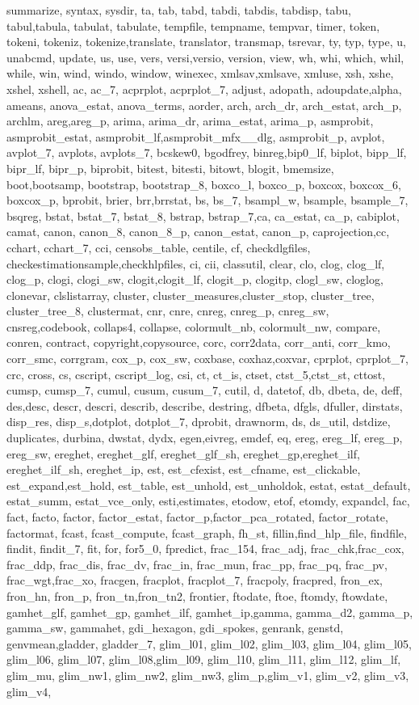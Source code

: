 {{summarize, syntax, sysdir, ta, tab, tabd, tabdi, tabdis, tabdisp, tabu, tabul,tabula, tabulat, tabulate, tempfile, tempname, tempvar, timer, token, tokeni, tokeniz, tokenize,translate, translator, transmap, tsrevar, ty, typ, type, u, unabcmd, update, us, use, vers, versi,versio, version, view, wh, whi, which, whil, while, win, wind, windo, window, winexec, xmlsav,xmlsave, xmluse, xsh, xshe, xshel, xshell, ac, ac_7, acprplot, acprplot_7, adjust, adopath, adoupdate,alpha, ameans, anova_estat, anova_terms, aorder, arch, arch_dr, arch_estat, arch_p, archlm, areg,areg_p, arima, arima_dr, arima_estat, arima_p, asmprobit, asmprobit_estat, asmprobit_lf,asmprobit_mfx__dlg, asmprobit_p, avplot, avplot_7, avplots, avplots_7, bcskew0, bgodfrey, binreg,bip0_lf, biplot, bipp_lf, bipr_lf, bipr_p, biprobit, bitest, bitesti, bitowt, blogit, bmemsize, boot,bootsamp, bootstrap, bootstrap_8, boxco_l, boxco_p, boxcox, boxcox_6, boxcox_p, bprobit, brier, brr,brrstat, bs, bs_7, bsampl_w, bsample, bsample_7, bsqreg, bstat, bstat_7, bstat_8, bstrap, bstrap_7,ca, ca_estat, ca_p, cabiplot, camat, canon, canon_8, canon_8_p, canon_estat, canon_p, caprojection,cc, cchart, cchart_7, cci, censobs_table, centile, cf, checkdlgfiles, checkestimationsample,checkhlpfiles, ci, cii, classutil, clear, clo, clog, clog_lf, clog_p, clogi, clogi_sw, clogit,clogit_lf, clogit_p, clogitp, clogl_sw, cloglog, clonevar, clslistarray, cluster, cluster_measures,cluster_stop, cluster_tree, cluster_tree_8, clustermat, cnr, cnre, cnreg, cnreg_p, cnreg_sw, cnsreg,codebook, collaps4, collapse, colormult_nb, colormult_nw, compare, conren, contract, copyright,copysource, corc, corr2data, corr_anti, corr_kmo, corr_smc, corrgram, cox_p, cox_sw, coxbase, coxhaz,coxvar, cprplot, cprplot_7, crc, cross, cs, cscript, cscript_log, csi, ct, ct_is, ctset, ctst_5,ctst_st, cttost, cumsp, cumsp_7, cumul, cusum, cusum_7, cutil, d, datetof, db, dbeta, de, deff, des,desc, descr, descri, describ, describe, destring, dfbeta, dfgls, dfuller, dirstats, disp_res, disp_s,dotplot, dotplot_7, dprobit, drawnorm, ds, ds_util, dstdize, duplicates, durbina, dwstat, dydx, egen,eivreg, emdef, eq, ereg, ereg_lf, ereg_p, ereg_sw, ereghet, ereghet_glf, ereghet_glf_sh, ereghet_gp,ereghet_ilf, ereghet_ilf_sh, ereghet_ip, est, est_cfexist, est_cfname, est_clickable, est_expand,est_hold, est_table, est_unhold, est_unholdok, estat, estat_default, estat_summ, estat_vce_only, esti,estimates, etodow, etof, etomdy, expandcl, fac, fact, facto, factor, factor_estat, factor_p,factor_pca_rotated, factor_rotate, factormat, fcast, fcast_compute, fcast_graph, fh_st, fillin,find_hlp_file, findfile, findit, findit_7, fit, for, for5_0, fpredict, frac_154, frac_adj, frac_chk,frac_cox, frac_ddp, frac_dis, frac_dv, frac_in, frac_mun, frac_pp, frac_pq, frac_pv, frac_wgt,frac_xo, fracgen, fracplot, fracplot_7, fracpoly, fracpred, fron_ex, fron_hn, fron_p, fron_tn,fron_tn2, frontier, ftodate, ftoe, ftomdy, ftowdate, gamhet_glf, gamhet_gp, gamhet_ilf, gamhet_ip,gamma, gamma_d2, gamma_p, gamma_sw, gammahet, gdi_hexagon, gdi_spokes, genrank, genstd, genvmean,gladder, gladder_7, glim_l01, glim_l02, glim_l03, glim_l04, glim_l05, glim_l06, glim_l07, glim_l08,glim_l09, glim_l10, glim_l11, glim_l12, glim_lf, glim_mu, glim_nw1, glim_nw2, glim_nw3, glim_p,glim_v1, glim_v2, glim_v3, glim_v4, }}
